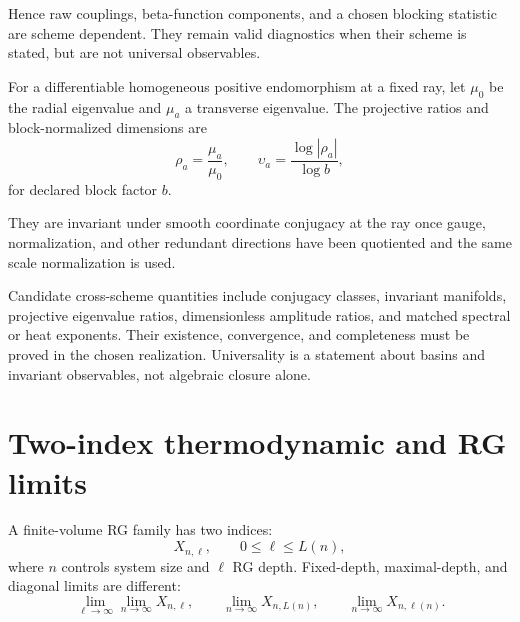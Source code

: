Hence raw couplings, beta-function components, and a chosen blocking statistic
are scheme dependent. They remain valid diagnostics when their scheme is
stated, but are not universal observables. 

For a differentiable homogeneous positive endomorphism at a fixed ray, let
\(\mu_0\) be the radial eigenvalue and \(\mu_a\) a transverse eigenvalue.
The projective ratios and block-normalized dimensions are
\begin{equation}
\rho_a=\frac{\mu_a}{\mu_0},\qquad
\upsilon_a=\frac{\log|\rho_a|}{\log b},
\label{eq:rg-projective-dimensions}
\end{equation}
for declared block factor \(b\). 

They are invariant
under smooth coordinate conjugacy at the ray once gauge, normalization, and
other redundant directions have been quotiented and the same scale
normalization is used. 

Candidate cross-scheme quantities include conjugacy classes, invariant
manifolds, projective eigenvalue ratios, dimensionless amplitude ratios, and
matched spectral or heat exponents. Their existence, convergence, and
completeness must be proved in the chosen realization. Universality is a
statement about basins and invariant observables, not algebraic closure
alone. 

\section{Two-index thermodynamic and RG limits}
\label{sec:rg-two-index-limits}

A finite-volume RG family has two indices:
\begin{equation}
X_{n,\ell},\qquad 0\leq\ell\leq L(n),
\label{eq:rg-two-index-family}
\end{equation}
where \(n\) controls system size and \(\ell\) RG depth. Fixed-depth,
maximal-depth, and diagonal limits are different:
\begin{equation}
\lim_{\ell\to\infty}\lim_{n\to\infty}X_{n,\ell},
\qquad
\lim_{n\to\infty}X_{n,L(n)},
\qquad
\lim_{n\to\infty}X_{n,\ell(n)}.
\label{eq:rg-two-index-limits}
\end{equation}

